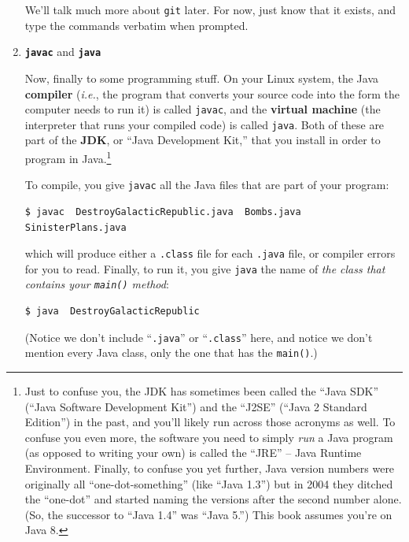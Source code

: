 \begin{enumerate}
We'll talk much more about \texttt{git} later. For now, just know that it
exists, and type the commands verbatim when prompted.

\bigline
\item \textbf{\texttt{javac}} and \textbf{\texttt{java}}

Now, finally to some programming stuff. On your Linux system, the Java
\textbf{compiler} (\textit{i.e.}, the program that converts your source code
into the form the computer needs to run it) is called \texttt{javac}, and the
\textbf{virtual machine} (the interpreter that runs your compiled code) is
called \texttt{java}. Both of these are part of the \textbf{JDK}, or ``Java
Development Kit,'' that you install in order to program in Java.\footnote{Just
to confuse you, the JDK has sometimes been called the ``Java SDK'' (``Java
Software Development Kit'') and the ``J2SE'' (``Java 2 Standard Edition'') in the
past, and you'll likely run across those acronyms as well. To confuse you even
more, the software you need to simply \textit{run} a Java program (as opposed
to writing your own) is called the ``JRE'' -- Java Runtime Environment.
Finally, to confuse you yet further, Java version numbers were originally all
``one-dot-something'' (like ``Java 1.3'') but in 2004 they ditched the
``one-dot'' and started naming the versions after the second number alone. (So,
the successor to ``Java 1.4'' was ``Java 5.'') This book assumes you're on Java
8.}


To compile, you give \texttt{javac} all the Java files that are part of your
program:

\begin{Verbatim}[fontsize=\small]
$ javac  DestroyGalacticRepublic.java  Bombs.java  SinisterPlans.java
\end{Verbatim}

which will produce either a \texttt{.class} file for each \texttt{.java} file,
or compiler errors for you to read. Finally, to run it, you give \texttt{java}
the name of \textit{the class that contains your \texttt{main()} method}:

\begin{Verbatim}[fontsize=\small]
$ java  DestroyGalacticRepublic
\end{Verbatim}

(Notice we don't include ``\texttt{.java}'' or ``\texttt{.class}'' here, and
notice we don't mention every Java class, only the one that has the
\texttt{main()}.)

\end{enumerate}


